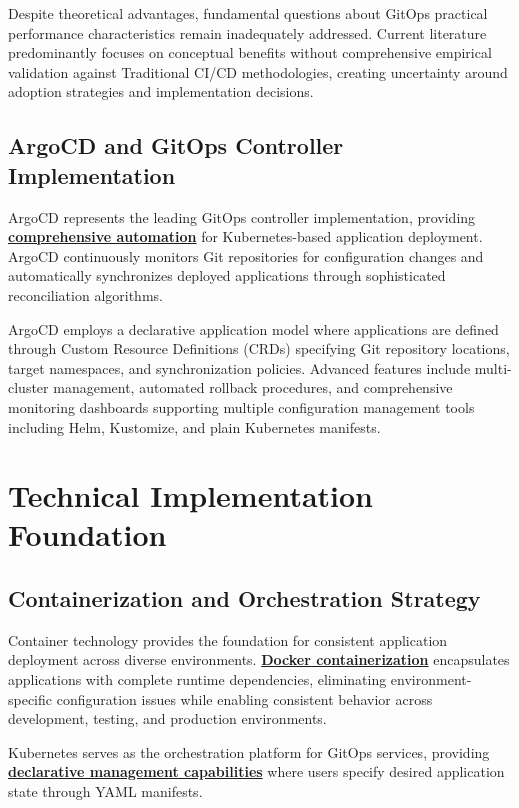 Despite theoretical advantages, fundamental questions about GitOps practical performance characteristics remain inadequately addressed. Current literature predominantly focuses on conceptual benefits without comprehensive empirical validation against Traditional CI/CD methodologies, creating uncertainty around adoption strategies and implementation decisions.

\subsection{ArgoCD and GitOps Controller Implementation}

ArgoCD represents the leading GitOps controller implementation, providing \textbf{\hyperref[argo_cd_docs]{comprehensive automation}} for Kubernetes-based application deployment. ArgoCD continuously monitors Git repositories for configuration changes and automatically synchronizes deployed applications through sophisticated reconciliation algorithms.

ArgoCD employs a declarative application model where applications are defined through Custom Resource Definitions (CRDs) specifying Git repository locations, target namespaces, and synchronization policies. Advanced features include multi-cluster management, automated rollback procedures, and comprehensive monitoring dashboards supporting multiple configuration management tools including Helm, Kustomize, and plain Kubernetes manifests.

\section{Technical Implementation Foundation}

\subsection{Containerization and Orchestration Strategy}

Container technology provides the foundation for consistent application deployment across diverse environments. \textbf{\hyperref[docker2023documentation]{Docker containerization}} encapsulates applications with complete runtime dependencies, eliminating environment-specific configuration issues while enabling consistent behavior across development, testing, and production environments.

Kubernetes serves as the orchestration platform for GitOps services, providing \textbf{\hyperref[kubernetes_docs]{declarative management capabilities}} where users specify desired application state through YAML manifests.

